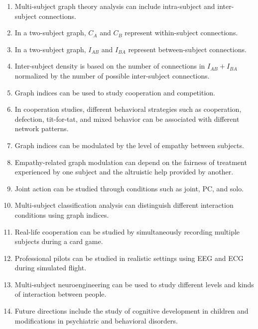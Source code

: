 \begin{enumerate}[label=\arabic*.]
    \item Multi-subject graph theory analysis can include intra-subject and inter-subject connections.
    
    \item In a two-subject graph, $C_A$ and $C_B$ represent within-subject connections.
    
    \item In a two-subject graph, $I_{AB}$ and $I_{BA}$ represent between-subject connections.
    
    \item Inter-subject density is based on the number of connections in $I_{AB}+I_{BA}$ normalized by the number of possible inter-subject connections.
    
    \item Graph indices can be used to study cooperation and competition.
    
    \item In cooperation studies, different behavioral strategies such as cooperation, defection, tit-for-tat, and mixed behavior can be associated with different network patterns.
    
    \item Graph indices can be modulated by the level of empathy between subjects.
    
    \item Empathy-related graph modulation can depend on the fairness of treatment experienced by one subject and the altruistic help provided by another.
    
    \item Joint action can be studied through conditions such as joint, PC, and solo.
    
    \item Multi-subject classification analysis can distinguish different interaction conditions using graph indices.
    
    \item Real-life cooperation can be studied by simultaneously recording multiple subjects during a card game.
    
    \item Professional pilots can be studied in realistic settings using EEG and ECG during simulated flight.
    
    \item Multi-subject neuroengineering can be used to study different levels and kinds of interaction between people.
    
    \item Future directions include the study of cognitive development in children and modifications in psychiatric and behavioral disorders.
    

\end{enumerate}
